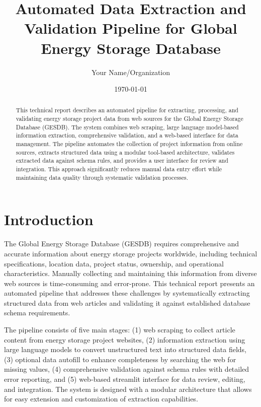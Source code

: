 \documentclass[11pt]{article}
\title{Automated Data Extraction and Validation Pipeline for Global Energy Storage Database}
\author{Your Name/Organization}
\date{\today}
\begin{document}
\maketitle

\begin{abstract}
This technical report describes an automated pipeline for extracting, processing, and validating energy storage project data from web sources for the Global Energy Storage Database (GESDB). The system combines web scraping, large language model-based information extraction, comprehensive validation, and a web-based interface for data management. The pipeline automates the collection of project information from online sources, extracts structured data using a modular tool-based architecture, validates extracted data against schema rules, and provides a user interface for review and integration. This approach significantly reduces manual data entry effort while maintaining data quality through systematic validation processes.
\end{abstract}

\section{Introduction}
\label{sec:introduction}

The Global Energy Storage Database (GESDB) requires comprehensive and accurate information about energy storage projects worldwide, including technical specifications, location data, project status, ownership, and operational characteristics. Manually collecting and maintaining this information from diverse web sources is time-consuming and error-prone. This technical report presents an automated pipeline that addresses these challenges by systematically extracting structured data from web articles and validating it against established database schema requirements.

The pipeline consists of five main stages: (1) web scraping to collect article content from energy storage project websites, (2) information extraction using large language models to convert unstructured text into structured data fields, (3) optional data autofill to enhance completeness by searching the web for missing values, (4) comprehensive validation against schema rules with detailed error reporting, and (5) web-based streamlit interface for data review, editing, and integration. The system is designed with a modular architecture that allows for easy extension and customization of extraction capabilities.
\end{document}
